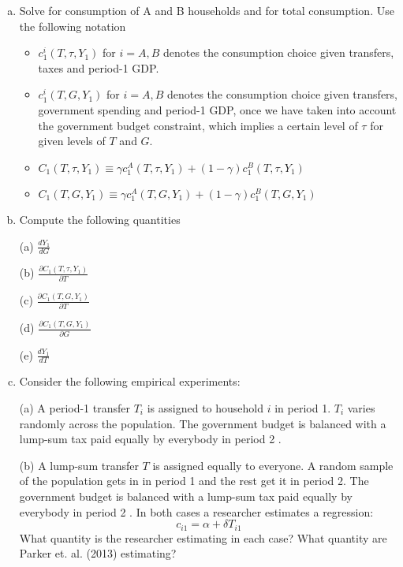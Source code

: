 \documentclass[11pt]{extarticle}
\theoremstyle{plain}
\theoremstyle{definition}
\begin{document}
\begin{enumerate}[(a)]
\item Solve for consumption of A and B households and for total consumption. Use the following
notation

\begin{itemize}
\item $c_1^i\left(T, \tau, Y_1\right)$ for $i=A, B$ denotes the consumption choice given transfers, taxes and period-1 GDP.

\item $c_1^i\left(T, G, Y_1\right)$ for $i=A, B$ denotes the consumption choice given transfers, government spending and period-1 GDP, once we have taken into account the government budget constraint, which implies a certain level of $\tau$ for given levels of $T$ and $G$.


\item $C_1\left(T, \tau, Y_1\right) \equiv \gamma c_1^A\left(T, \tau, Y_1\right)+(1-\gamma) c_1^B\left(T, \tau, Y_1\right)$

\item $C_1\left(T, G, Y_1\right) \equiv \gamma c_1^A\left(T, G, Y_1\right)+(1-\gamma) c_1^B\left(T, G, Y_1\right)$

\end{itemize}

\item Compute the following quantities

(a) $\frac{d Y_1}{d G}$



(b) $\frac{\partial C_1\left(T, \tau, Y_1\right)}{\partial T}$


(c) $\frac{\partial C_1\left(T, G, Y_1\right)}{\partial T}$


(d) $\frac{\partial C_1\left(T, G, Y_1\right)}{\partial G}$


(e) $\frac{d Y_1}{d T}$


\item Consider the following empirical experiments:

(a) A period-1 transfer $T_i$ is assigned to household $i$ in period 1. $T_i$ varies randomly across the population. The government budget is balanced with a lump-sum tax paid equally by everybody in period 2 .

(b) A lump-sum transfer $T$ is assigned equally to everyone. A random sample of the population gets in in period 1 and the rest get it in period 2. The government budget is balanced with a lump-sum tax paid equally by everybody in period 2 .
In both cases a researcher estimates a regression:
$$
c_{i 1}=\alpha+\delta T_{i 1}
$$
What quantity is the researcher estimating in each case? What quantity are Parker et. al. (2013) estimating?




\end{enumerate}
\end{document}
